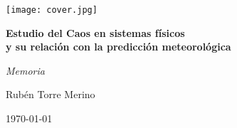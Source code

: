 \begin{titlepage}
  \centering
  \vspace*{-1cm}
  \texttt{[image: cover.jpg]}\par
  \vspace{1.2cm}

  {\Huge\bfseries\color{Main} Estudio del Caos en sistemas físicos\\[2mm]
  y su relación con la predicción meteorológica\par}

  \vspace{0.8cm}
  {\Large\color{gray!60} \textit{Memoria}}\par

  \vspace{1.2cm}
  {\Large Rubén Torre Merino}\par

  \vfill
  {\large \today}\par
\end{titlepage}
